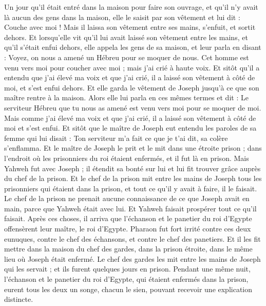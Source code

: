 \begin{multicols}{2}
Un jour qu'il était entré dans la maison pour faire son ouvrage, et qu'il n'y avait là aucun des gens dans la maison,
elle le saisit par son vêtement et lui dit : Couche avec moi ! Mais il laissa son vêtement entre ses mains, s'enfuit, et sortit dehors.
Et lorsqu'elle vit qu'il lui avait laissé son vêtement entre les mains, et qu'il s'était enfui dehors,
elle appela les gens de sa maison, et leur parla en disant : Voyez, on nous a amené un Hébreu pour se moquer de nous. Cet homme est venu vers moi pour coucher avec moi ; mais j'ai crié à haute voix.
Et sitôt qu'il a entendu que j'ai élevé ma voix et que j'ai crié, il a laissé son vêtement à côté de moi, et s'est enfui dehors.
Et elle garda le vêtement de Joseph jusqu'à ce que son maître rentre à la maison.
Alors elle lui parla en ces mêmes termes et dit : Le serviteur Hébreu que tu nous as amené est venu vers moi pour se moquer de moi.
Mais comme j'ai élevé ma voix et que j'ai crié, il a laissé son vêtement à côté de moi et s'est enfui.
Et sitôt que le maître de Joseph eut entendu les paroles de sa femme qui lui disait : Ton serviteur m'a fait ce que je t'ai dit, sa colère s'enflamma.
Et le maître de Joseph le prit et le mit dans une étroite prison ; dans l'endroit où les prisonniers du roi étaient enfermés, et il fut là en prison.
Mais Yahweh fut avec Joseph ; il étendit sa bonté sur lui et lui fit trouver grâce auprès du chef de la prison.
Et le chef de la prison mit entre les mains de Joseph tous les prisonniers qui étaient dans la prison, et tout ce qu'il y avait à faire, il le faisait.
Le chef de la prison ne prenait aucune connaissance de ce que Joseph avait en main, parce que Yahweh était avec lui. Et Yahweh faisait prospérer tout ce qu'il faisait.
\VerseOne{}Après ces choses, il arriva que l'échanson et le panetier du roi d'Egypte offensèrent leur maître, le roi d'Egypte.
Pharaon fut fort irrité contre ces deux eunuques, contre le chef des échansons, et contre le chef des panetiers.
Et il les fit mettre dans la maison du chef des gardes, dans la prison étroite, dans le même lieu où Joseph était enfermé.
Le chef des gardes les mit entre les mains de Joseph qui les servait ; et ils furent quelques jours en prison.
Pendant une même nuit, l'échanson et le panetier du roi d'Egypte, qui étaient enfermés dans la prison, eurent tous les deux un songe, chacun le sien, pouvant recevoir une explication distincte.

\end{multicols}

